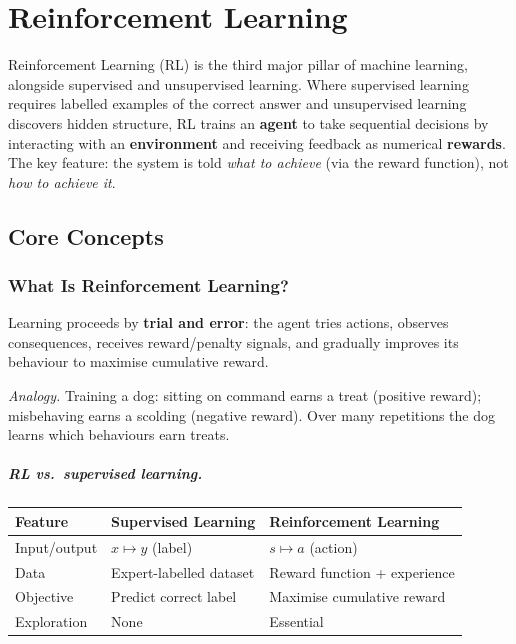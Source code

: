 \chapter{Reinforcement Learning}

Reinforcement Learning (RL) is the third major pillar of machine learning,
alongside supervised and unsupervised learning. Where supervised learning
requires labelled examples of the correct answer and unsupervised learning
discovers hidden structure, RL trains an \textbf{agent} to take sequential
decisions by interacting with an \textbf{environment} and receiving feedback
as numerical \textbf{rewards}. The key feature: the system is told
\emph{what to achieve} (via the reward function), not \emph{how to achieve it}.

\section{Core Concepts}

\subsection{What Is Reinforcement Learning?}

Learning proceeds by \textbf{trial and error}: the agent tries actions,
observes consequences, receives reward/penalty signals, and gradually improves
its behaviour to maximise cumulative reward.

\textit{Analogy.} Training a dog: sitting on command earns a treat (positive
reward); misbehaving earns a scolding (negative reward). Over many repetitions
the dog learns which behaviours earn treats.

\paragraph{RL vs.\ supervised learning.}
\begin{center}
\begin{tabular}{lll}
\toprule
\textbf{Feature} & \textbf{Supervised Learning} & \textbf{Reinforcement Learning}\\
\midrule
Input/output & $x\mapsto y$ (label) & $s\mapsto a$ (action)\\
Data & Expert-labelled dataset & Reward function + experience\\
Objective & Predict correct label & Maximise cumulative reward\\
Exploration & None & Essential\\
\bottomrule
\end{tabular}
\end{center}

